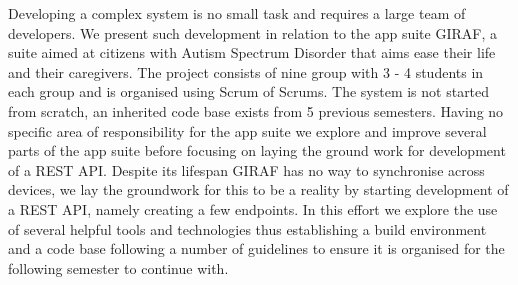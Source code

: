 Developing a complex system is no small task and requires a large team of developers.
We present such development in relation to the app suite GIRAF, a suite aimed at citizens with Autism Spectrum Disorder that aims ease their life and their caregivers.
The project consists of nine group with 3 - 4 students in each group and is organised using Scrum of Scrums.
The system is not started from scratch, an inherited code base exists from 5 previous semesters.
Having no specific area of responsibility for the app suite we explore and improve several parts of the app suite before focusing on laying the ground work for development of a REST API.
Despite its lifespan GIRAF has no way to synchronise across devices, we lay the groundwork for this to be a reality by starting development of a REST API, namely creating a few endpoints.
In this effort we explore the use of several helpful tools and technologies thus establishing a build environment and a code base following a number of guidelines to ensure it is organised for the following semester to continue with.
